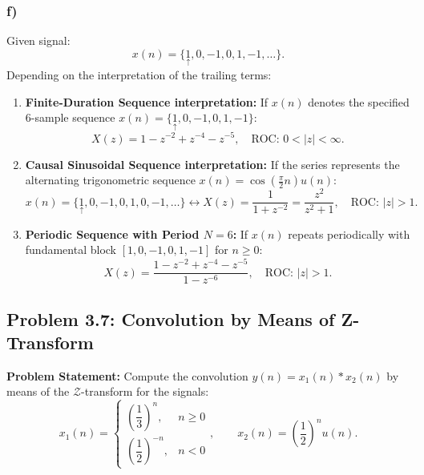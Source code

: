 \documentclass[12pt,a4paper]{article}
\newcommand{\org}[1]{\underset{\uparrow}{#1}}
\begin{document}
\subsubsection*{f)}
Given signal:
\begin{equation}
    x(n) = \{\org{1}, 0, -1, 0, 1, -1, \dots\}.
\end{equation}
Depending on the interpretation of the trailing terms:
\begin{enumerate}
    \item \textbf{Finite-Duration Sequence interpretation:} If $x(n)$ denotes the specified 6-sample sequence $x(n) = \{\org{1}, 0, -1, 0, 1, -1\}$:
    \begin{equation}
        X(z) = 1 - z^{-2} + z^{-4} - z^{-5}, \quad \text{ROC: } 0 < |z| < \infty.
    \end{equation}
    \item \textbf{Causal Sinusoidal Sequence interpretation:} If the series represents the alternating trigonometric sequence $x(n) = \cos\left(\frac{\pi}{2} n\right) u(n)$:
    \begin{equation}
        x(n) = \{\org{1}, 0, -1, 0, 1, 0, -1, \dots\} \longleftrightarrow X(z) = \frac{1}{1 + z^{-2}} = \frac{z^2}{z^2 + 1}, \quad \text{ROC: } |z| > 1.
    \end{equation}
    \item \textbf{Periodic Sequence with Period $N=6$:} If $x(n)$ repeats periodically with fundamental block $[1, 0, -1, 0, 1, -1]$ for $n \ge 0$:
    \begin{equation}
        X(z) = \frac{1 - z^{-2} + z^{-4} - z^{-5}}{1 - z^{-6}}, \quad \text{ROC: } |z| > 1.
    \end{equation}
\end{enumerate}

\subsection{Problem 3.7: Convolution by Means of Z-Transform}
\textbf{Problem Statement:} Compute the convolution $y(n) = x_1(n) * x_2(n)$ by means of the $\mathcal{Z}$-transform for the signals:
\begin{equation}
    x_1(n) = \begin{cases} \left(\dfrac{1}{3}\right)^n, & n \ge 0 \\ \left(\dfrac{1}{2}\right)^{-n}, & n < 0 \end{cases}, \qquad x_2(n) = \left(\frac{1}{2}\right)^n u(n).
\end{equation}
\end{document}
